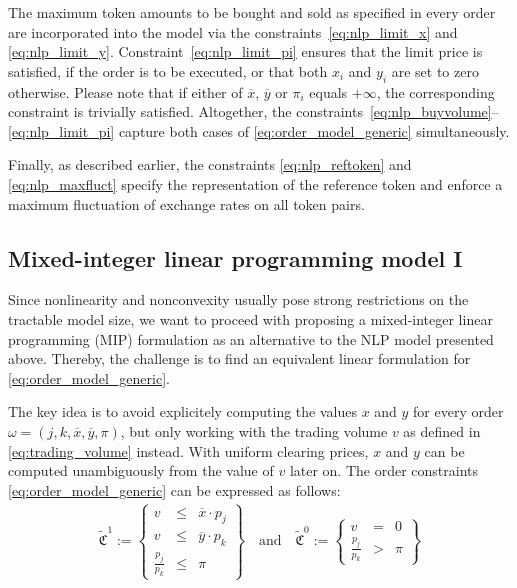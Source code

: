 \documentclass[11pt,parskip=full]{scrartcl}%
\begin{document}
The maximum token amounts to be bought and sold as specified in every order are incorporated
into the model via the constraints~\eqref{eq:nlp_limit_x} and \eqref{eq:nlp_limit_y}.
Constraint~\eqref{eq:nlp_limit_pi} ensures that the limit price is satisfied, if the order is
to be executed, or that both $ x_i $ and $ y_i $ are set to zero otherwise.
Please note that if either of $\overline{x}$, $\overline{y}$ or $\pi_i$ equals $+\infty$, the
corresponding constraint is trivially satisfied.
Altogether, the constraints~\eqref{eq:nlp_buyvolume}--\eqref{eq:nlp_limit_pi} capture both
cases of \eqref{eq:order_model_generic} simultaneously.

Finally, as described earlier, the constraints \eqref{eq:nlp_reftoken} and \eqref{eq:nlp_maxfluct}
specify the representation of the reference token and enforce a maximum fluctuation of exchange
rates on all token pairs.


\newpage
\subsection{Mixed-integer linear programming model I}
\label{subsec:MIP1}

Since nonlinearity and nonconvexity usually pose strong restrictions on the tractable model size,
we want to proceed with proposing a mixed-integer linear programming (MIP) formulation as an
alternative to the NLP model presented above.
Thereby, the challenge is to find an equivalent linear formulation for 
\eqref{eq:order_model_generic}.

The key idea is to avoid explicitely computing the values $x$ and $y$ for every order
$\omega = (j,k,\overline{x},\overline{y},\pi)$, but only working with the trading volume $v$ as
defined in \eqref{eq:trading_volume} instead.
With uniform clearing prices, $x$ and $y$ can be computed unambiguously from the value of $v$
later on.
The order constraints \eqref{eq:order_model_generic} can be expressed as follows:
\begin{align}
  \tilde{\mathfrak{C}}^1 := \left\{
  \begin{array}{rlll}
    v &\le & \overline{x} \cdot p_j \\
    v &\le & \overline{y} \cdot p_k \\[1mm]
    \frac{p_j}{p_k} &\le & \pi
  \end{array}
  \right\}
  \quad
  \text{and}
  \quad
  \tilde{\mathfrak{C}}^0 := \left\{
  \begin{array}{rll}
    v &= & 0 \\[1mm]
    \frac{p_j}{p_k} &> & \pi
  \end{array}
  \right\}
  \label{eq:order_model_mip1}
\end{align}
\end{document}
